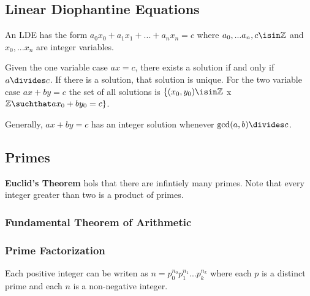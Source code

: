 \documentclass[12pt]{article}
\begin{document}

\subsection*{Linear Diophantine Equations}
 An LDE has the form $a_0x_0 + a_1x_1 + ... + a_nx_n = c$ where $a_0, ... a_n, c \isin \mathbb{Z}$ and $x_0, ... x_n$ are integer variables.

Given the one variable case $ax = c$, there exists a solution if and only if $a \divides c$. If there is a solution, that solution is unique. For the two variable case $ax + by = c$ the set of all solutions is $\{ (x_0, y_0) \isin \mathbb{Z}$ x $\mathbb{Z} \suchthat ax_0 + by_0 = c \}$.

Generally, $ax + by = c$ has an integer solution whenever $\gcd(a,b) \divides c$.



\subsection*{Primes}
{\bf Euclid's Theorem} hols that there are infintiely many primes. Note that every integer greater than two is a product of primes.


\subsubsection*{Fundamental Theorem of Arithmetic}

\subsubsection*{Prime Factorization}
Each positive integer can be writen as $n = p_0^{n_0} p_1^{n_1} ... p_k^{n_k}$ where each $p$ is a distinct prime and each $n$ is a non-negative integer.
\end{document}
